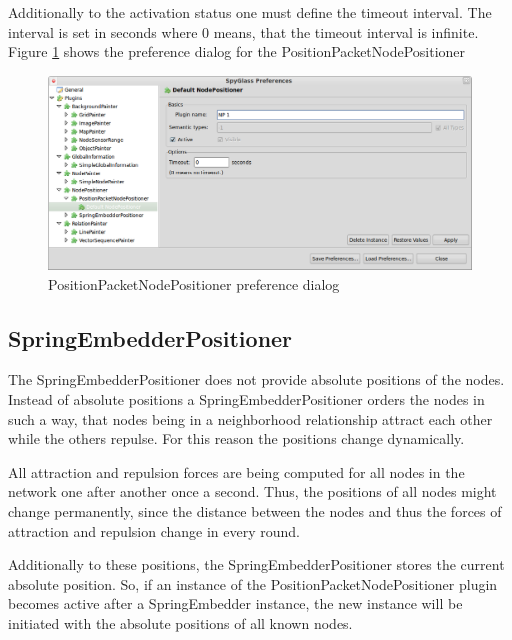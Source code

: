 Additionally to the activation status one must define the timeout interval. The interval is set in seconds where 0 means,
that the timeout interval is infinite. Figure \ref{pic:ppnp_preferences} shows the preference dialog
for the PositionPacketNodePositioner

\begin{figure}[htb]
  \begin{center}
    \includegraphics[width=13.2cm]{./pics/positionpacketnodepositioner_prefpage}
    \caption{PositionPacketNodePositioner preference dialog}
    \label{pic:ppnp_preferences}
  \end{center}
\end{figure}

\subsection{SpringEmbedderPositioner}
\label{subsection:sep}

The SpringEmbedderPositioner does not provide absolute positions of the nodes. Instead of absolute positions
a SpringEmbedderPositioner orders the nodes in such a way, that
nodes being in a neighborhood relationship attract each other while the others repulse. For this reason
the positions change dynamically.

All attraction and repulsion forces are being computed for all nodes in the network one after another
once a second. Thus, the positions of all nodes might change permanently, since the distance between the nodes
and thus the forces of attraction and repulsion change in every round.

Additionally to these positions, the SpringEmbedderPositioner stores the current absolute position. So, if an instance of the
PositionPacketNodePositioner plugin becomes active after a SpringEmbedder instance, the new instance will be
initiated with the absolute positions of all known nodes.

